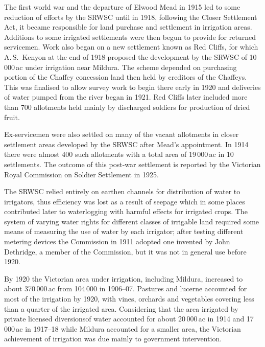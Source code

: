 The first world war and the departure of Elwood Mead in 1915 led to
some reduction of efforts by the SRWSC until in 1918, following the
Closer Settlement Act, it became responsible for land purchase and
settlement in irrigation areas.  Additions to some irrigated
settlements were then begun to provide for returned servicemen.  Work
also began on a new settlement known as Red Cliffs, for which
A.\,S.~Kenyon at the end of 1918 proposed the development by the SRWSC
of 10\,000\,ac under irrigation near Mildura.  The scheme depended on
purchasing portion of the Chaffey concession land then held by
creditors of the Chaffeys.  This was finalised to allow survey work to
begin there early in 1920 and deliveries of water pumped from the
river began in 1921.  Red Cliffs later included more than 700
allotments held mainly by discharged soldiers for production of dried
fruit.

Ex-servicemen were also settled on many of the vacant allotments in
closer settlement areas developed by the SRWSC after Mead's
appointment.  In 1914 there were almost 400 such allotments with a
total area of 19\,000\,ac in 10 settlements. The outcome of this
post-war settlement is reported by the Victorian Royal Commission on
Soldier Settlement in 1925.

The SRWSC relied entirely on earthen channels for distribution of
water to irrigators, thus efficiency was lost as a result of seepage
which in some places contributed later to waterlogging with harmful
effects for irrigated crops.  The system of varying water rights for
different classes of irrigable land required some means of measuring
the use of water by each irrigator; after testing different metering
devices the Commission in 1911 adopted one invented by John Dethridge,
a member of the Commission, but it was not in general use before
1920.

By 1920 the Victorian area under irrigation, including Mildura,
increased to about 370\,000\,ac from 104\,000 in 1906--07.  Pastures
and lucerne accounted for most of the irrigation by 1920, with vines,
orchards and vegetables covering less than a quarter of the irrigated
area. Considering that the area irrigated by private licensed
diversionsof water accounted for about 20\,000\,ac in 1914 and
17\,000\,ac in 1917--18 while Mildura accounted for a smaller area,
the Victorian achievement of irrigation was due mainly to government
intervention.

